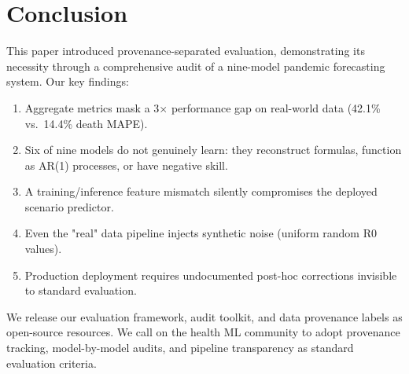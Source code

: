 \documentclass{ieeeaccess}
\begin{document}
\section{Conclusion}

This paper introduced provenance-separated evaluation, demonstrating its necessity through a comprehensive audit of a nine-model pandemic forecasting system. Our key findings:

\begin{enumerate}
    \item Aggregate metrics mask a 3$\times$ performance gap on real-world data (42.1\% vs.\ 14.4\% death MAPE).
    \item Six of nine models do not genuinely learn: they reconstruct formulas, function as AR(1) processes, or have negative skill.
    \item A training/inference feature mismatch silently compromises the deployed scenario predictor.
    \item Even the "real" data pipeline injects synthetic noise (uniform random R0 values).
    \item Production deployment requires undocumented post-hoc corrections invisible to standard evaluation.
\end{enumerate}

We release our evaluation framework, audit toolkit, and data provenance labels as open-source resources. We call on the health ML community to adopt provenance tracking, model-by-model audits, and pipeline transparency as standard evaluation criteria.
\end{document}
